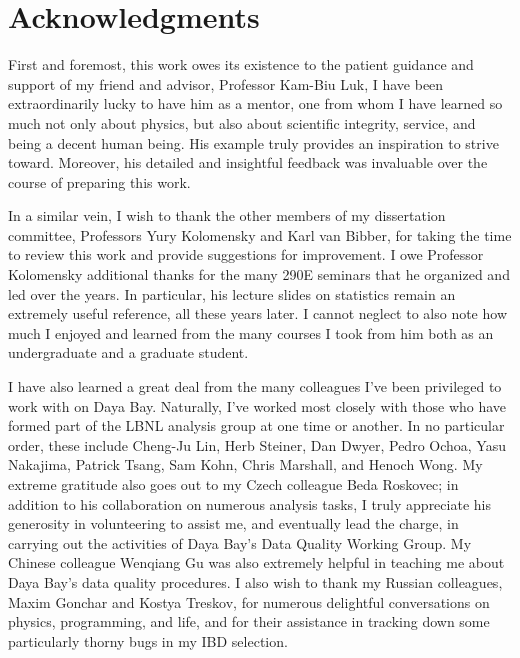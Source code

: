 \documentclass[../thesis.tex]{subfiles}
\begin{document}
\chapter*[Acknowledgments]{Acknowledgments}

First and foremost, this work owes its existence to the patient guidance and support of my friend and advisor, Professor Kam-Biu Luk, I have been extraordinarily lucky to have him as a mentor, one from whom I have learned so much not only about physics, but also about scientific integrity, service, and being a decent human being. His example truly provides an inspiration to strive toward. Moreover, his detailed and insightful feedback was invaluable over the course of preparing this work.

In a similar vein, I wish to thank the other members of my dissertation committee, Professors Yury Kolomensky and Karl van Bibber, for taking the time to review this work and provide suggestions for improvement. I owe Professor Kolomensky additional thanks for the many 290E seminars that he organized and led over the years. In particular, his lecture slides on statistics remain an extremely useful reference, all these years later. I cannot neglect to also note how much I enjoyed and learned from the many courses I took from him both as an undergraduate and a graduate student.

I have also learned a great deal from the many colleagues I've been privileged to work with on Daya Bay. Naturally, I've worked most closely with those who have formed part of the LBNL analysis group at one time or another. In no particular order, these include Cheng-Ju Lin, Herb Steiner, Dan Dwyer, Pedro Ochoa, Yasu Nakajima, Patrick Tsang, Sam Kohn, Chris Marshall, and Henoch Wong. My extreme gratitude also goes out to my Czech colleague Beda Roskovec; in addition to his collaboration on numerous analysis tasks, I truly appreciate his generosity in volunteering to assist me, and eventually lead the charge, in carrying out the activities of Daya Bay's Data Quality Working Group. My Chinese colleague Wenqiang Gu was also extremely helpful in teaching me about Daya Bay's data quality procedures. I also wish to thank my Russian colleagues, Maxim Gonchar and Kostya Treskov, for numerous delightful conversations on physics, programming, and life, and for their assistance in tracking down some particularly thorny bugs in my IBD selection.
\end{document}
